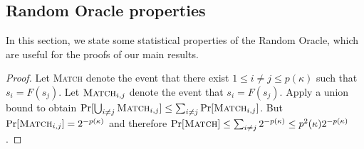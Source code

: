 \subsection{Random Oracle properties}\label{sec:proofs:ro}

In this section, we state some statistical properties of the Random
Oracle, which are useful for the proofs of our main results.

\restateLemPerturbation*
\begin{proof}
  Let \textsc{Match} denote the event that there exist $1 \leq i \neq j \leq p(\kappa)$ such that $s_i = F(s_j)$.
  Let $\textsc{Match}_{i, j}$ denote the event that $s_i = F(s_j)$. Apply a union bound to obtain
  $
    \Pr[\bigcup_{i \neq j}\textsc{Match}_{i, j}] \leq \sum_{i \neq j} \Pr[\textsc{Match}_{i, j}]
  $.
  But $\Pr[\textsc{Match}_{i, j}] = 2^{-p(\kappa)}$ and therefore
  $\Pr[\textsc{Match}] \leq \sum_{i \neq j} 2^{-p(\kappa)} \leq p^2(\kappa) 2^{-p(\kappa)}$.
\end{proof}